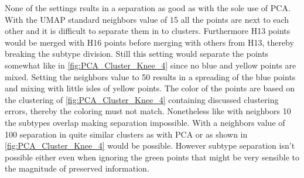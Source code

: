 None of the settings rsults in a separation as good as with the sole use of \gls{PCA}. With the \gls{UMAP} standard neighbors value of 15 all the points are next to each other and it is difficult to separate them in to clusters. Furthermore H13 points would be merged with H16 points before merging with others from H13, thereby breaking the subtype division. Still this setting would separate the points somewhat like in \autoref{fig:PCA_Cluster_Knee_4} since no blue and yellow points are mixed. Setting the neighbors value to 50 results in a spreading of the blue points and mixing with little isles of yellow points. The color of the points are based on the clustering of \autoref{fig:PCA_Cluster_Knee_4} containing discussed clustering errors, thereby the coloring must not match. Nonetheless like with neighbors 10 the subtypes overlap making separation impossible. With a neighbors value of 100 separation in quite similar clusters as with \gls{PCA} or as shown in \autoref{fig:PCA_Cluster_Knee_4} would be possible. However subtype separation isn't possible either even when ignoring the green points that might be very sensible to the magnitude of preserved information.



